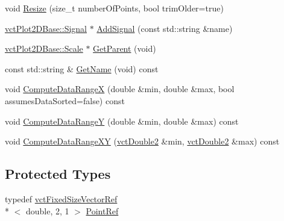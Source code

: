 \begin{DoxyCompactItemize}
\item 
void \hyperlink{classvct_plot2_d_base_1_1_signal_a2614ca9ee337428ef780788f94a50474}{Resize} (size\-\_\-t number\-Of\-Points, bool trim\-Older=true)
\item 
\hyperlink{classvct_plot2_d_base_1_1_signal}{vct\-Plot2\-D\-Base\-::\-Signal} $\ast$ \hyperlink{classvct_plot2_d_base_1_1_signal_ac3b25683c0fc73be0851daa0a8601693}{Add\-Signal} (const std\-::string \&name)
\item 
\hyperlink{classvct_plot2_d_base_1_1_scale}{vct\-Plot2\-D\-Base\-::\-Scale} $\ast$ \hyperlink{classvct_plot2_d_base_1_1_signal_ad5ad5a5ac33cbdb3d258260419a62af5}{Get\-Parent} (void)
\item 
const std\-::string \& \hyperlink{classvct_plot2_d_base_1_1_signal_a876661f9df487814fc833a76ec849606}{Get\-Name} (void) const 
\end{DoxyCompactItemize}
{\bf }\par
\begin{DoxyCompactItemize}
\item 
void \hyperlink{classvct_plot2_d_base_1_1_signal_ad3c405fcaf31f7af60b4c0fdabc6006b}{Compute\-Data\-Range\-X} (double \&min, double \&max, bool assumes\-Data\-Sorted=false) const 
\item 
void \hyperlink{classvct_plot2_d_base_1_1_signal_a59133a2bee2795a8931bcc8f2cac96a1}{Compute\-Data\-Range\-Y} (double \&min, double \&max) const 
\item 
void \hyperlink{classvct_plot2_d_base_1_1_signal_a16f1ed79c4dde3cec730c324be029f42}{Compute\-Data\-Range\-X\-Y} (\hyperlink{vct_fixed_size_vector_types_8h_afc0fdcc41cbe8b043747612501610812}{vct\-Double2} \&min, \hyperlink{vct_fixed_size_vector_types_8h_afc0fdcc41cbe8b043747612501610812}{vct\-Double2} \&max) const 
\end{DoxyCompactItemize}

\subsection*{Protected Types}
\begin{DoxyCompactItemize}
\item 
typedef \hyperlink{classvct_fixed_size_vector_ref}{vct\-Fixed\-Size\-Vector\-Ref}\\*
$<$ double, 2, 1 $>$ \hyperlink{classvct_plot2_d_base_1_1_signal_a81b636c91281333319b7f806b8432b92}{Point\-Ref}
\end{DoxyCompactItemize}
